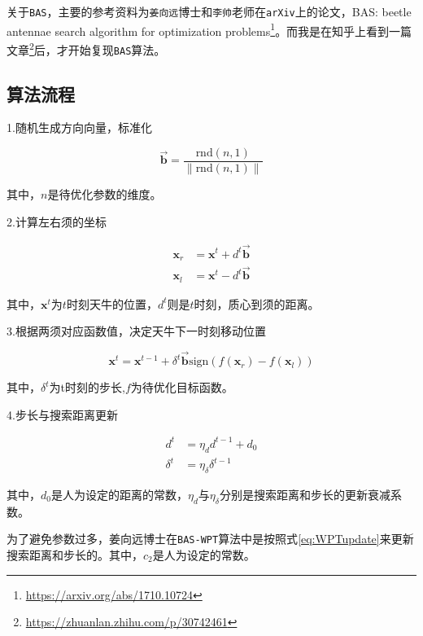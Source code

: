 \documentclass[]{ctexbook}
\renewcommand{\href}[2]{#2\footnote{\url{#1}}}
\begin{document}
关于\texttt{BAS}，主要的参考资料为\texttt{姜向远}博士和\texttt{李帅}老师在\texttt{arXiv}上的论文，\href{https://arxiv.org/abs/1710.10724}{BAS:
beetle antennae search algorithm for optimization
problems}。而我是在知乎上看到一篇\href{https://zhuanlan.zhihu.com/p/30742461}{文章}后，才开始复现\texttt{BAS}算法。

\subsection{算法流程}\label{BASflow}

1.随机生成方向向量，标准化

\begin{equation}
\overrightarrow{\mathbf{b}}=\frac{\text{rnd}(n,1)}{\|\text{rnd}(n,1)\|}
\label{eq:dir}
\end{equation}

其中，\(n\)是待优化参数的维度。

2.计算左右须的坐标

\begin{equation}
\begin{split}
\mathbf{x}_r&=\mathbf{x}^t+d^t\overrightarrow{\mathbf{b}} \\
\mathbf{x}_l&=\mathbf{x}^t-d^t\overrightarrow{\mathbf{b}}
\end{split}
\label{eq:xlxr}
\end{equation}

其中，\(\mathbf{x}^t\)为\(t\)时刻天牛的位置，\(d^t\)则是\(t\)时刻，质心到须的距离。

3.根据两须对应函数值，决定天牛下一时刻移动位置

\begin{equation}
\mathbf{x}^t=\mathbf{x}^{t-1}+\delta^t\overrightarrow{\mathbf{b}}\text{sign}(f(\mathbf{x}_r)-f(\mathbf{x}_l))
\label{eq:xupdate}
\end{equation}

其中，\(\delta^t\)为t时刻的步长,\(f\)为待优化目标函数。

4.步长与搜索距离更新

\begin{align}
d^t&= \eta_d d^{t-1}+d_0 \label{eq:dupdate}\\
\delta^t&=\eta_{\delta} \delta^{t-1} \label{eq:deltaupdate}
\end{align}

其中，\(d_0\)是人为设定的距离的常数，\(\eta_d\)与\(\eta_\delta\)分别是搜索距离和步长的更新衰减系数。

为了避免参数过多，姜向远博士在\texttt{BAS-WPT}算法中是按照式\eqref{eq:WPTupdate}来更新搜索距离和步长的。其中，\(c_2\)是人为设定的常数。
\end{document}
